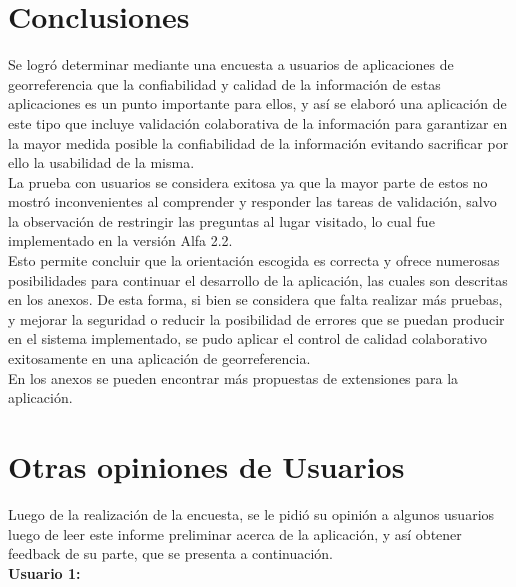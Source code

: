 \documentclass[10pt,letterpaper]{article}
\begin{document}
\newpage
\section{Conclusiones}

Se logró determinar mediante una encuesta a usuarios de aplicaciones de georreferencia que la confiabilidad y calidad de la información de estas aplicaciones es un punto importante para ellos, y así se elaboró una aplicación  de este tipo que incluye validación colaborativa de la información para garantizar en la mayor medida posible la confiabilidad de la información evitando sacrificar por ello la usabilidad de la misma.\\

La prueba con usuarios se considera exitosa ya que la mayor parte de estos no mostró inconvenientes al comprender y responder las tareas de validación, salvo la observación de restringir las preguntas al lugar visitado, lo cual fue implementado en la versión Alfa 2.2.\\

Esto permite concluir que la orientación escogida es correcta y ofrece numerosas posibilidades para continuar el desarrollo de la aplicación, las cuales son descritas en los anexos. De esta forma, si bien se considera que falta realizar más pruebas, y mejorar la seguridad o reducir la posibilidad de errores que se puedan producir en el sistema implementado, se pudo aplicar el control de calidad colaborativo exitosamente en una aplicación de georreferencia.\\

En los anexos se pueden encontrar más propuestas de extensiones para la aplicación.\\

\newpage
\appendix
\section{Otras opiniones de Usuarios}

Luego de la realización de la encuesta, se le pidió su opinión a algunos usuarios luego de leer este informe preliminar acerca de la aplicación, y así obtener feedback de su parte, que se presenta a continuación.\\

\textbf{Usuario 1:}\\
\end{document}
